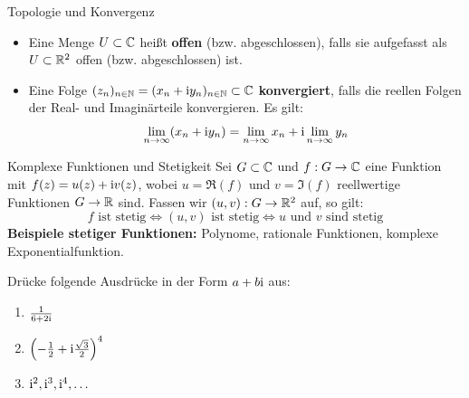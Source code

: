 \begin{defi}{Topologie und Konvergenz}
\begin{itemize}
    \item Eine Menge $U \subset \mathbb{C}$ heißt \textbf{offen} (bzw. abgeschlossen), falls sie aufgefasst als $U \subset \mathbb{R}^2$ offen (bzw. abgeschlossen) ist.
    \item Eine Folge $(z_n)_{n \in \mathbb{N}} = (x_n + \mathrm{i} y_n)_{n \in \mathbb{N}} \subset \mathbb{C}$ \textbf{konvergiert}, falls die reellen Folgen der Real- und Imaginärteile konvergieren. Es gilt:
    \[
        \lim_{n \to \infty} (x_n + \mathrm{i} y_n) = \lim_{n \to \infty} x_n + \mathrm{i} \lim_{n \to \infty} y_n
    \]
\end{itemize}
\end{defi}

\begin{defi}{Komplexe Funktionen und Stetigkeit}
Sei $G \subset \mathbb{C}$ und $f: G \to \mathbb{C}$ eine Funktion mit $f(z) = u(z) + \mathrm{i} v(z)$, wobei $u = \Re(f)$ und $v = \Im(f)$ reellwertige Funktionen $G \to \mathbb{R}$ sind. Fassen wir $(u,v): G \to \mathbb{R}^2$ auf, so gilt:
\[
    f \text{ ist stetig} \iff (u,v) \text{ ist stetig} \iff u \text{ und } v \text{ sind stetig}
\]
\textbf{Beispiele stetiger Funktionen:} Polynome, rationale Funktionen, komplexe Exponentialfunktion.
\end{defi}

\vspace{0.5cm}
\begin{tcolorbox}[colback=yellow!5!white, colframe=orange!75!black, fonttitle=\bfseries, title={Übungsblatt 1, Aufgabe 1}]
Drücke folgende Ausdrücke in der Form $a + b\mathrm{i}$ aus:
\begin{enumerate}
    \item[a)] $\frac{1}{6+2\mathrm{i}}$
    \item[b)] $\left(-\frac{1}{2} + \mathrm{i}\frac{\sqrt{3}}{2}\right)^4$
    \item[c)] $\mathrm{i}^2, \mathrm{i}^3, \mathrm{i}^4, \dots$
\end{enumerate}
\end{tcolorbox}